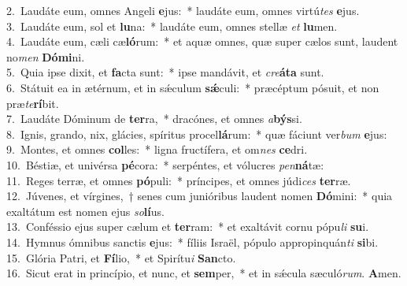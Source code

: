 {2.~}Laudáte eum, omnes Angeli \textbf{e}jus:~* laudáte eum, omnes virtú\textit{tes} \textbf{e}jus.\\
{3.~}Laudáte eum, sol et \textbf{lu}na:~* laudáte eum, omnes stellæ \textit{et} \textbf{lu}men.\\
{4.~}Laudáte eum, cæli cæ\textbf{ló}rum:~* et aquæ omnes, quæ super cælos sunt, laudent no\textit{men} \textbf{Dó}\textbf{mi}ni.\\
{5.~}Quia ipse dixit, et \textbf{fa}cta sunt:~* ipse mandávit, et \textit{cre}\textbf{á}\textbf{ta} sunt.\\
{6.~}Státuit ea in ætérnum, et in sǽculum \textbf{sǽ}culi:~* præcéptum pósuit, et non præ\textit{te}\textbf{rí}bit.\\
{7.~}Laudáte Dóminum de \textbf{ter}ra,~* dracónes, et omnes \textit{a}\textbf{býs}si.\\
{8.~}Ignis, grando, nix, glácies, spíritus procel\textbf{lá}rum:~* quæ fáciunt ver\textit{bum} \textbf{e}jus:\\
{9.~}Montes, et omnes \textbf{col}les:~* ligna fructífera, et om\textit{nes} \textbf{ce}dri.\\
{10.~}Béstiæ, et univérsa \textbf{pé}cora:~* serpéntes, et vólucres \textit{pen}\textbf{ná}tæ:\\
{11.~}Reges terræ, et omnes \textbf{pó}puli:~* príncipes, et omnes júdi\textit{ces} \textbf{ter}ræ.\\
{12.~}Júvenes, et vírgines,~† senes cum junióribus laudent nomen \textbf{Dó}mini:~* quia exaltátum est nomen ejus \textit{so}\textbf{lí}us.\\
{13.~}Conféssio ejus super cælum et \textbf{ter}ram:~* et exaltávit cornu pópu\textit{li} \textbf{su}i.\\
{14.~}Hymnus ómnibus sanctis \textbf{e}jus:~* fíliis Israël, pópulo appropinquán\textit{ti} \textbf{si}bi.\\
{15.~}Glória Patri, et \textbf{Fí}lio,~* et Spirítu\textit{i} \textbf{San}cto.\\
{16.~}Sicut erat in princípio, et nunc, et \textbf{sem}per,~* et in sǽcula sæculó\textit{rum}. \textbf{A}men.\\
